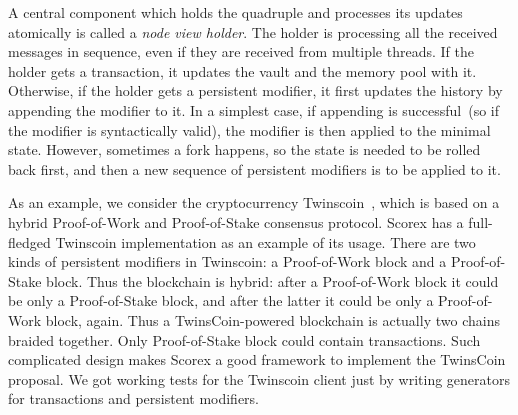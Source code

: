 A central component which holds the quadruple {\em <history, minimal state, vault, memory pool>} and processes its updates atomically is called a {\em node view holder}. The holder is processing all the received messages in sequence, even if they are received from multiple threads. If the holder gets a transaction, it updates the vault and the memory pool with it. Otherwise, if the holder gets a persistent modifier, it first updates the history by appending the modifier to it. In a simplest case, if appending is successful~(so if the modifier is syntactically valid), the modifier is then applied to the minimal state. However, sometimes a fork happens, so the state is needed to be rolled back first, and then a new sequence of persistent modifiers is to be applied to it. 

As an example, we consider the cryptocurrency Twinscoin~\cite{cryptoeprint:2017:232}, which is based on a hybrid Proof-of-Work and Proof-of-Stake consensus protocol. Scorex has a full-fledged Twinscoin implementation as an example of its usage. There are two kinds of persistent modifiers in Twinscoin: a Proof-of-Work block and a Proof-of-Stake block. Thus the blockchain is hybrid: after a Proof-of-Work block it could be only a Proof-of-Stake block, and after the latter it could be only a Proof-of-Work block, again. Thus a TwinsCoin-powered blockchain is actually two chains braided together. Only Proof-of-Stake block could contain transactions. Such complicated design makes Scorex a good framework to implement the TwinsCoin proposal. We got working tests for the Twinscoin client just by writing generators for transactions and persistent modifiers.
